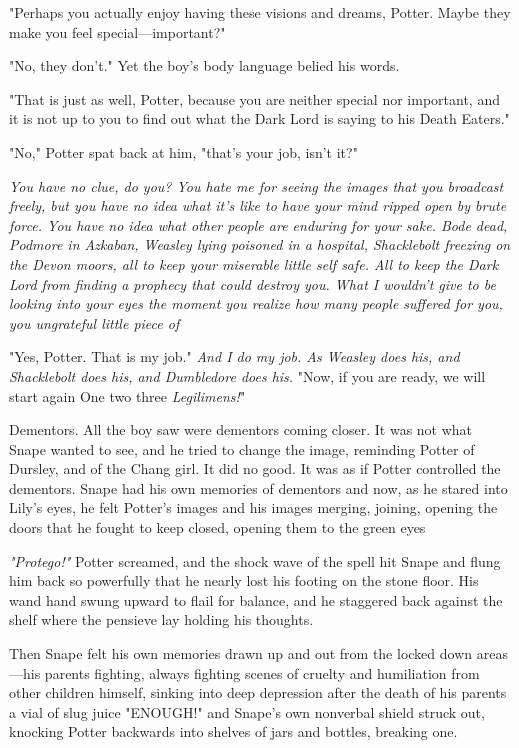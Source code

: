 "Perhaps you actually enjoy having these visions and dreams, Potter. Maybe they make you feel special—important?"

"No, they don't." Yet the boy's body language belied his words.

"That is just as well, Potter, because you are neither special nor important, and it is not up to you to find out what the Dark Lord is saying to his Death Eaters."

"No," Potter spat back at him, "that's your job, isn't it?"

\emph{You have no clue, do you? You hate me for seeing the images that you broadcast freely, but you have no idea what it's like to have your mind ripped open by brute force. You have no idea what other people are enduring for your sake. Bode dead, Podmore in Azkaban, Weasley lying poisoned in a hospital, Shacklebolt freezing on the Devon moors, all to keep your miserable little self safe. All to keep the Dark Lord from finding a prophecy that could destroy you. What I wouldn't give to be looking into your eyes the moment you realize how many people suffered for you, you ungrateful little piece of{\el}}

"Yes, Potter. That is my job." \emph{And I do my job. As Weasley does his, and Shacklebolt does his, and Dumbledore does his.} "Now, if you are ready, we will start again{\el} One{\el} two{\el} three{\el} \emph{Legilimens!}"

Dementors. All the boy saw were dementors coming closer. It was not what Snape wanted to see, and he tried to change the image, reminding Potter of Dursley, and of the Chang girl. It did no good. It was as if Potter controlled the dementors. Snape had his own memories of dementors and now, as he stared into Lily's eyes, he felt Potter's images and his images merging, joining, opening the doors that he fought to keep closed, opening them to the green eyes{\el}

\emph{"Protego!"} Potter screamed, and the shock wave of the spell hit Snape and flung him back so powerfully that he nearly lost his footing on the stone floor. His wand hand swung upward to flail for balance, and he staggered back against the shelf where the pensieve lay holding his thoughts.

Then Snape felt his own memories drawn up and out from the locked down areas—his parents fighting, always fighting{\el} scenes of cruelty and humiliation from other children{\el} himself, sinking into deep depression after the death of his parents{\el} a vial of slug juice{\el} "ENOUGH!" and Snape's own nonverbal shield struck out, knocking Potter backwards into shelves of jars and bottles, breaking one.


